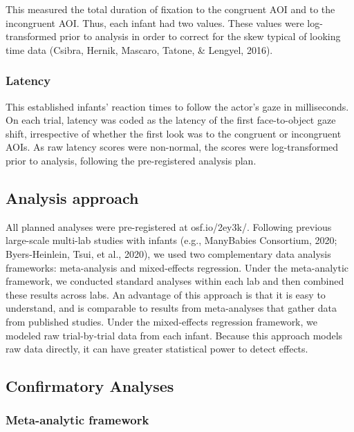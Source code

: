 \documentclass[english,,man,floatsintext]{apa6}
\begin{document}
This measured the total duration of fixation to the congruent AOI and to the incongruent AOI. Thus, each infant had two values. These values were log-transformed prior to analysis in order to correct for the skew typical of looking time data (Csibra, Hernik, Mascaro, Tatone, \& Lengyel, 2016).

\hypertarget{latency}{%
\subsubsection{Latency}\label{latency}}

This established infants' reaction times to follow the actor's gaze in milliseconds. On each trial, latency was coded as the latency of the first face-to-object gaze shift, irrespective of whether the first look was to the congruent or incongruent AOIs. As raw latency scores were non-normal, the scores were log-transformed prior to analysis, following the pre-registered analysis plan.

\hypertarget{analysis-approach}{%
\subsection{Analysis approach}\label{analysis-approach}}

All planned analyses were pre-registered at osf.io/2ey3k/. Following previous large-scale multi-lab studies with infants (e.g., ManyBabies Consortium, 2020; Byers-Heinlein, Tsui, et al., 2020), we used two complementary data analysis frameworks: meta-analysis and mixed-effects regression. Under the meta-analytic framework, we conducted standard analyses within each lab and then combined these results across labs. An advantage of this approach is that it is easy to understand, and is comparable to results from meta-analyses that gather data from published studies. Under the mixed-effects regression framework, we modeled raw trial-by-trial data from each infant. Because this approach models raw data directly, it can have greater statistical power to detect effects.

\hypertarget{confirmatory-analyses}{%
\subsection{Confirmatory Analyses}\label{confirmatory-analyses}}

\hypertarget{meta-analytic-framework}{%
\subsubsection{Meta-analytic framework}\label{meta-analytic-framework}}
\end{document}
